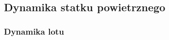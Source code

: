 \documentclass[aspectratio=169]{beamer}
\begin{document}
\subsection{Dynamika statku powietrznego}
\begin{frame}%
	\frametitle{Dynamika lotu}
	\begin{columns}
		\begin{column}{0.55\textwidth}
	   	 	\begin{figure}
	   		 \centering
	    		\end{figure}
		\end{column}
		\begin{column}{0.45\textwidth}
	   	 	\begin{figure}
	   		 \centering
	    		\end{figure}
		\end{column}
	\end{columns}
\end{frame}
\end{document}
